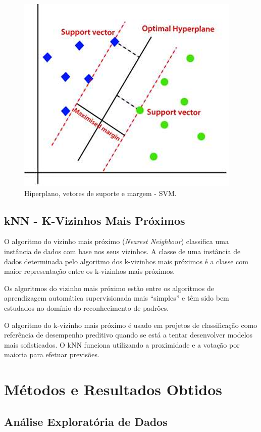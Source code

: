 \documentclass[conference]{IEEEtran}
\begin{document}
\begin{figure}
	\centering
	\includegraphics[width=0.7\linewidth]{svm}
	\caption{Hiperplano, vetores de suporte e margem - SVM.}
	\label{fig:svm}
\end{figure}


\subsection{kNN - K-Vizinhos Mais Próximos}


O algoritmo do vizinho mais próximo (\textit{Nearest Neighbour}) classifica uma instância de dados com base nos seus vizinhos. A classe de uma instância de dados determinada pelo algoritmo dos k-vizinhos mais próximos é a classe com maior representação entre os k-vizinhos mais próximos. 

Os algoritmos do vizinho mais próximo estão entre os algoritmos de aprendizagem automática supervisionada mais “simples” e têm sido bem estudados no domínio do reconhecimento de padrões. 

O algoritmo do k-vizinho mais próximo é usado em projetos de classificação como referência de desempenho preditivo quando se está a tentar desenvolver modelos mais sofisticados. O kNN funciona utilizando a proximidade e a votação por maioria para efetuar previsões. \cite{madureira2024knn}

\section{Métodos e Resultados Obtidos}

\subsection{Análise Exploratória de Dados}
\medskip
\end{document}
